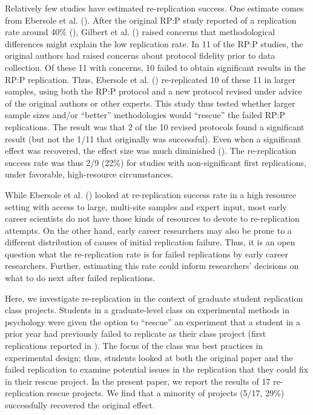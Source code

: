 \documentclass[
  english,
  a4paper,
]{article}
\begin{document}
Relatively few studies have estimated re-replication success.
One estimate comes from Ebersole et al. ().
After the original RP:P study reported of a replication rate around 40\% (), Gilbert et al. () raised concerns that methodological differences might explain the low replication rate.
In 11 of the RP:P studies, the original authors had raised concerns about protocol fidelity prior to data collection.
Of these 11 with concerns, 10 failed to obtain significant results in the RP:P replication.
Thus, Ebersole et al. () re-replicated 10 of these 11 in larger samples, using both the RP:P protocol and a new protocol revised under advice of the original authors or other experts.
This study thus tested whether larger sample sizes and/or ``better'' methodologies would ``rescue'' the failed RP:P replications.
The result was that 2 of the 10 revised protocols found a significant result (but not the 1/11 that originally was successful).
Even when a significant effect was recovered, the effect size was much diminished ().
The re-replication success rate was thus 2/9 (22\%) for studies with non-significant first replications, under favorable, high-resource circumstances.

While Ebersole et al. () looked at re-replication success rate in a high resource setting with access to large, multi-site samples and expert input, most early career scientists do not have those kinds of resources to devote to re-replication attempts.
On the other hand, early career researchers may also be prone to a different distribution of causes of initial replication failure.
Thus, it is an open question what the re-replication rate is for failed replications by early career researchers.
Further, estimating this rate could inform researchers' decisions on what to do next after failed replications.

Here, we investigate re-replication in the context of graduate student replication class projects.
Students in a graduate-level class on experimental methods in psychology were given the option to ``rescue'' an experiment that a student in a prior year had previously failed to replicate as their class project (first replications reported in ).
The focus of the class was best practices in experimental design; thus, students looked at both the original paper and the failed replication to examine potential issues in the replication that they could fix in their rescue project.
In the present paper, we report the results of 17 re-replication rescue projects.
We find that a minority of projects (5/17, 29\%) successfully recovered the original effect.
\end{document}

